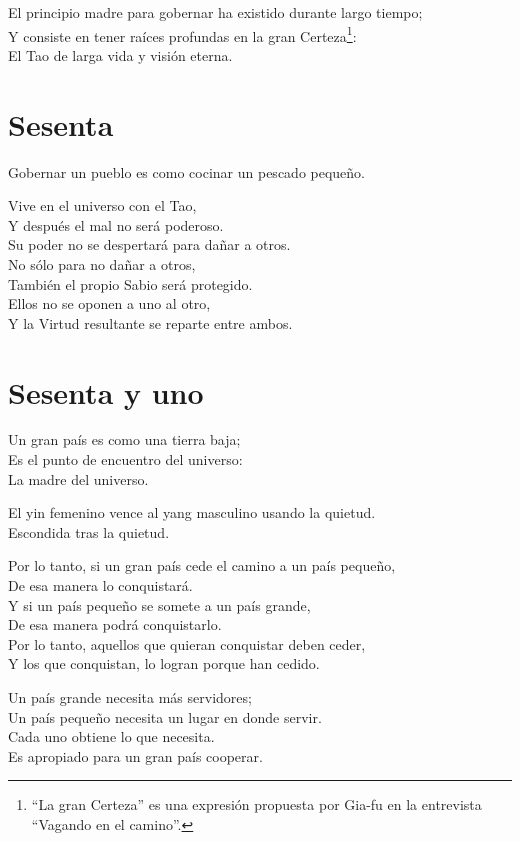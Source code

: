 \documentclass[hidelinks]{memoir}
\begin{document}
	El principio madre para gobernar ha existido durante largo tiempo;\\
	Y consiste en tener raíces profundas en la gran Certeza\footnote{``La gran Certeza'' es una expresión propuesta por Gia-fu en la
		entrevista ``Vagando en el camino''.}:\\
	El Tao de larga vida y visión eterna.
	
	\chapter*{Sesenta}
	
	Gobernar un pueblo es como cocinar un pescado pequeño.
	
	Vive en el universo con el Tao,\\
	Y después el mal no será poderoso.\\
	Su poder no se despertará para dañar a otros.\\
	No sólo para no dañar a otros,\\
	También el propio Sabio será protegido.\\
	Ellos no se oponen a uno al otro,\\
	Y la Virtud resultante se reparte entre ambos.
	
	\chapter*{Sesenta y uno}
	
	Un gran país es como una tierra baja;\\
	Es el punto de encuentro del universo:\\
	La madre del universo.
	
	El yin femenino vence al yang masculino usando la quietud.\\
	Escondida tras la quietud.
	
	Por lo tanto, si un gran país cede el camino a un país pequeño,\\
	De esa manera lo conquistará.\\
	Y si un país pequeño se somete a un país grande,\\
	De esa manera podrá conquistarlo.\\
	Por lo tanto, aquellos que quieran conquistar deben ceder,\\
	Y los que conquistan, lo logran porque han cedido.
	
	Un país grande necesita más servidores;\\
	Un país pequeño necesita un lugar en donde servir.\\
	Cada uno obtiene lo que necesita.\\
	Es apropiado para un gran país cooperar.
	
\end{document}
